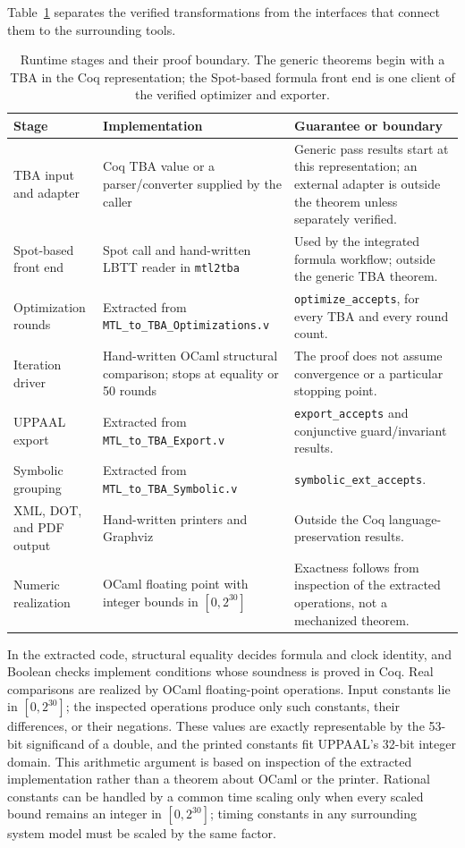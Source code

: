 \documentclass{ieeeaccess}
\begin{document}
Table~\ref{tab:component-boundary} separates the verified transformations
from the interfaces that connect them to the surrounding tools.
\begin{table}[t]
\centering
\caption{Runtime stages and their proof boundary. The generic theorems begin
with a TBA in the Coq representation; the Spot-based formula front end is one
client of the verified optimizer and exporter.}
\label{tab:component-boundary}
\footnotesize
\begin{tabular}{@{}p{}p{}p{}@{}}
\toprule
Stage & Implementation & Guarantee or boundary\\
\midrule
TBA input and adapter & Coq TBA value or a parser/converter supplied by the caller & Generic pass results start at this representation; an external adapter is outside the theorem unless separately verified.\\
Spot-based front end & Spot call and hand-written LBTT reader in \texttt{mtl2tba} & Used by the integrated formula workflow; outside the generic TBA theorem.\\
Optimization rounds & Extracted from \texttt{MTL\_to\_TBA\_Optimizations.v} & \texttt{optimize\_accepts}, for every TBA and every round count.\\
Iteration driver & Hand-written OCaml structural comparison; stops at equality or 50 rounds & The proof does not assume convergence or a particular stopping point.\\
UPPAAL export & Extracted from \texttt{MTL\_to\_TBA\_Export.v} & \texttt{export\_accepts} and conjunctive guard/invariant results.\\
Symbolic grouping & Extracted from \texttt{MTL\_to\_TBA\_Symbolic.v} & \texttt{symbolic\_ext\_accepts}.\\
XML, DOT, and PDF output & Hand-written printers and Graphviz & Outside the Coq language-preservation results.\\
Numeric realization & OCaml floating point with integer bounds in $[0,2^{30}]$ & Exactness follows from inspection of the extracted operations, not a mechanized theorem.\\
\bottomrule
\end{tabular}
\end{table}

In the extracted code, structural equality decides formula and clock
identity, and Boolean checks implement conditions whose soundness is proved
in Coq. Real comparisons are realized by OCaml floating-point operations.
Input constants lie in $[0,2^{30}]$; the inspected operations produce only
such constants, their differences, or their negations. These values are
exactly representable by the 53-bit significand of a double, and the printed
constants fit UPPAAL's 32-bit integer domain. This arithmetic argument is
based on inspection of the extracted implementation rather than a theorem
about OCaml or the printer. Rational constants can be handled by a common time
scaling only when every scaled bound remains an integer in $[0,2^{30}]$; timing
constants in any surrounding system model must be scaled by the same factor.
\end{document}
